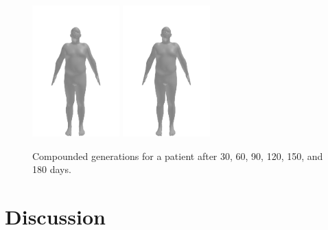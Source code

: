 \begin{figure}[h]
	\includegraphics[width=0.3\textwidth]{files/patients/2_predicted_6}
	\includegraphics[width=0.3\textwidth]{files/patients/2_predicted_7}
	\caption[Compounded generations]{Compounded generations for a patient after 30, 60, 90, 120, 150, and 180 days.}
	\label{fig:pred-2}
\end{figure}

\section{Discussion}

